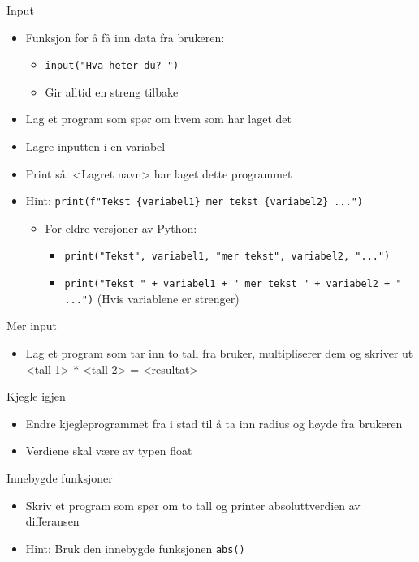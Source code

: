 \documentclass[screen, aspectratio=169]{beamer}
\begin{document}
\begin{frame}[fragile]{Input}
	\begin{itemize}
		\item Funksjon for å få inn data fra brukeren:
		\begin{itemize}
			\item \lstinline|input("Hva heter du? ")|
			\item Gir alltid en streng tilbake
		\end{itemize}
		\item Lag et program som spør om hvem som har laget det
		\item Lagre inputten i en variabel
		\item Print så: <Lagret navn> har laget dette programmet
		\vspace{1em}
		\item Hint: \lstinline|print(f"Tekst {variabel1} mer tekst {variabel2} ...")|
		\begin{itemize}
			\item For eldre versjoner av Python:
			\begin{itemize}
				\item  \lstinline|print("Tekst", variabel1, "mer tekst", variabel2, "...")|
				\item \lstinline|print("Tekst " + variabel1 + " mer tekst " + variabel2 + " ...")| (Hvis variablene er strenger)
			\end{itemize}
		\end{itemize}
	\end{itemize}
\end{frame}

\begin{frame}{Mer input}
	\begin{itemize}
		\item Lag et program som tar inn to tall fra bruker, multipliserer dem og skriver ut <tall 1> * <tall 2> = <resultat>
	\end{itemize}
\end{frame}

\begin{frame}{Kjegle igjen}
	\begin{itemize}
		\item Endre kjegleprogrammet fra i stad til å ta inn radius og høyde fra brukeren
		\item Verdiene skal være av typen float
	\end{itemize}
\end{frame}

\begin{frame}[fragile]{Innebygde funksjoner}
	\begin{itemize}
		\item Skriv et program som spør om to tall og printer absoluttverdien av differansen
		\item Hint: Bruk den innebygde funksjonen \lstinline|abs()|
	\end{itemize}
\end{frame}
\end{document}
